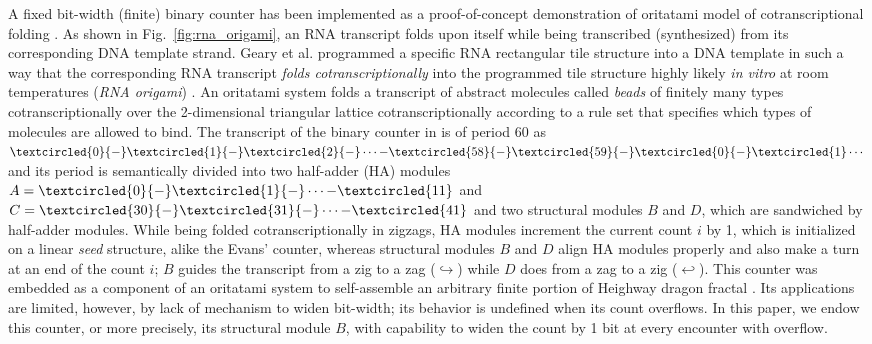 \documentclass[runningheads]{llncs}
\begin{document}
A fixed bit-width (finite) binary counter has been implemented as a proof-of-concept demonstration of oritatami model of cotranscriptional folding \cite{GeMeScSe2019}. 
As shown in Fig.~\ref{fig:rna_origami}, an RNA transcript folds upon itself while being transcribed (synthesized) from its corresponding DNA template strand. 
Geary et al. programmed a specific RNA rectangular tile structure into a DNA template in such a way that the corresponding RNA transcript \textit{folds cotranscriptionally} into the programmed tile structure highly likely \textit{in vitro} at room temperatures (\textit{RNA origami}) \cite{GearyRothemundAndersen2014}. 
An oritatami system folds a transcript of abstract molecules called \textit{beads} of finitely many types cotranscriptionally over the 2-dimensional triangular lattice cotranscriptionally according to a rule set that specifies which types of molecules are allowed to bind. 
The transcript of the binary counter in \cite{GeMeScSe2019} is of period 60 as $\textcircled{\scriptsize 0}{-}\textcircled{\scriptsize 1}{-}\textcircled{\scriptsize 2}{-} \cdots {-}\textcircled{\scriptsize 58}{-}\textcircled{\scriptsize 59}{-}\textcircled{\scriptsize 0}{-}\textcircled{\scriptsize 1} \cdots$ and its period is semantically divided into two half-adder (HA) modules $A = \textcircled{\scriptsize 0}{-}\textcircled{\scriptsize 1}{-} \cdots {-}\textcircled{\scriptsize 11}$ and $C = \textcircled{\scriptsize 30}{-}\textcircled{\scriptsize 31}{-} \cdots {-}\textcircled{\scriptsize 41}$ and two structural modules $B$ and $D$, which are sandwiched by half-adder modules.
While being folded cotranscriptionally in zigzags, HA modules increment the current count $i$ by 1, which is initialized on a linear \textit{seed} structure, alike the Evans' counter, whereas structural modules $B$ and $D$ align HA modules properly and also make a turn at an end of the count $i$; $B$ guides the transcript from a zig to a zag ($\hookrightarrow$) while $D$ does from a zag to a zig ($\hookleftarrow$). 
This counter was embedded as a component of an oritatami system to self-assemble an arbitrary finite portion of Heighway dragon fractal \cite{MasudaSekiUbukata2018}. 
Its applications are limited, however, by lack of mechanism to widen bit-width; its behavior is undefined when its count overflows. 
In this paper, we endow this counter, or more precisely, its structural module $B$, with capability to widen the count by 1 bit at every encounter with overflow. 
\end{document}
